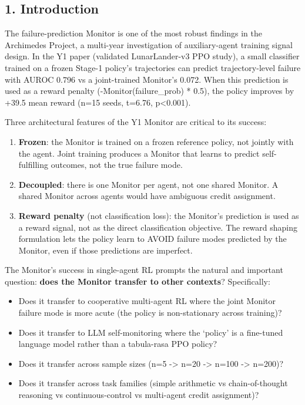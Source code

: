 \documentclass[
]{article}
\providecommand{\tightlist}{%
  \setlength{\itemsep}{0pt}\setlength{\parskip}{0pt}}
\begin{document}
\subsection{1. Introduction}\label{introduction}

The failure-prediction Monitor is one of the most robust findings in the
Archimedes Project, a multi-year investigation of auxiliary-agent
training signal design. In the Y1 paper (validated LunarLander-v3 PPO
study), a small classifier trained on a frozen Stage-1 policy's
trajectories can predict trajectory-level failure with AUROC 0.796 vs a
joint-trained Monitor's 0.072. When this prediction is used as a reward
penalty (-Monitor(failure\_prob) * 0.5), the policy improves by +39.5
mean reward (n=15 seeds, t=6.76, p\textless0.001).

Three architectural features of the Y1 Monitor are critical to its
success:

\begin{enumerate}
\def\labelenumi{\arabic{enumi}.}
\tightlist
\item
  \textbf{Frozen}: the Monitor is trained on a frozen reference policy,
  not jointly with the agent. Joint training produces a Monitor that
  learns to predict self-fulfilling outcomes, not the true failure mode.
\item
  \textbf{Decoupled}: there is one Monitor per agent, not one shared
  Monitor. A shared Monitor across agents would have ambiguous credit
  assignment.
\item
  \textbf{Reward penalty} (not classification loss): the Monitor's
  prediction is used as a reward signal, not as the direct
  classification objective. The reward shaping formulation lets the
  policy learn to AVOID failure modes predicted by the Monitor, even if
  those predictions are imperfect.
\end{enumerate}

The Monitor's success in single-agent RL prompts the natural and
important question: \textbf{does the Monitor transfer to other
contexts}? Specifically:

\begin{itemize}
\tightlist
\item
  Does it transfer to cooperative multi-agent RL where the joint Monitor
  failure mode is more acute (the policy is non-stationary across
  training)?
\item
  Does it transfer to LLM self-monitoring where the `policy' is a
  fine-tuned language model rather than a tabula-rasa PPO policy?
\item
  Does it transfer across sample sizes (n=5 -\textgreater{} n=20
  -\textgreater{} n=100 -\textgreater{} n=200)?
\item
  Does it transfer across task families (simple arithmetic vs
  chain-of-thought reasoning vs continuous-control vs multi-agent credit
  assignment)?
\end{itemize}
\end{document}
